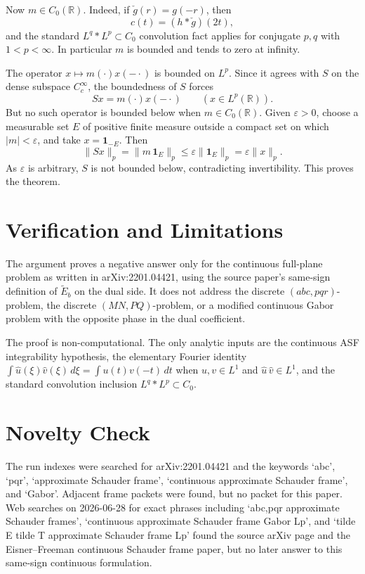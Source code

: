 \documentclass[11pt]{article}
\begin{document}
Now \(m\in C_0(\mathbb R)\).  Indeed, if \(\check g(r)=g(-r)\), then
\[
  c(t)=(h*\check g)(2t),
\]
and the standard \(L^q*L^p\subset C_0\) convolution fact applies for conjugate
\(p,q\) with \(1<p<\infty\).  In particular \(m\) is bounded and tends to zero
at infinity.

The operator \(x\mapsto m(\cdot)x(-\cdot)\) is bounded on \(L^p\).  Since it
agrees with \(S\) on the dense subspace \(C_c^\infty\), the boundedness of
\(S\) forces
\[
  Sx=m(\cdot)x(-\cdot)\qquad (x\in L^p(\mathbb R)).
\]
But no such operator is bounded below when \(m\in C_0(\mathbb R)\).  Given
\(\varepsilon>0\), choose a measurable set \(E\) of positive finite measure
outside a compact set on which \(|m|<\varepsilon\), and take
\(x=\mathbf 1_{-E}\).  Then
\[
 \|Sx\|_p=\|m\,\mathbf 1_E\|_p\le \varepsilon \|\mathbf 1_E\|_p
       =\varepsilon\|x\|_p .
\]
As \(\varepsilon\) is arbitrary, \(S\) is not bounded below, contradicting
invertibility.  This proves the theorem.

\section*{Verification and Limitations}

The argument proves a negative answer only for the continuous full-plane
problem as written in arXiv:2201.04421, using the source paper's same-sign
definition of \(\widetilde E_b\) on the dual side.  It does not address the
discrete \((abc,pqr)\)-problem, the discrete \((MN,PQ)\)-problem, or a modified
continuous Gabor problem with the opposite phase in the dual coefficient.

The proof is non-computational.  The only analytic inputs are the continuous ASF
integrability hypothesis, the elementary Fourier identity
\(\int \widehat u(\xi)\widehat v(\xi)\,d\xi=\int u(t)v(-t)\,dt\) when
\(u,v\in L^1\) and \(\widehat u\,\widehat v\in L^1\), and the standard
convolution inclusion \(L^q*L^p\subset C_0\).

\section*{Novelty Check}

The run indexes were searched for arXiv:2201.04421 and the keywords
`abc', `pqr', `approximate Schauder frame', `continuous approximate Schauder
frame', and `Gabor'.  Adjacent frame packets were found, but no packet for this
paper.  Web searches on 2026-06-28 for exact phrases including
`abc,pqr approximate Schauder frames', `continuous approximate Schauder frame
Gabor Lp', and `tilde E tilde T approximate Schauder frame Lp' found the source
arXiv page and the Eisner--Freeman continuous Schauder frame paper, but no later
answer to this same-sign continuous formulation.
\end{document}

